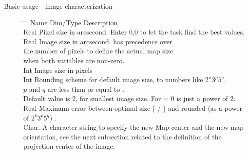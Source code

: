 \begin{description}
\item[Basic usage - image characterization] \mbox{}
\begin{tabbing}
\hspace{0.0cm} \= \hspace{3.4cm} \= \hspace{2.cm} \= \kill
\> Name \> Dim/Type \> Description \\
\>     \> [2] Real \> Pixel size in arcsecond. Enter 0,0 to let the task find the best values. \\
\>   \>[2] Real \> Image size in arcsecond.   has precedence over \\
                \> \> \> the number of pixels  to define the  actual map size \\
                \> \> \> when both variables are non-zero. \\
\>    \> [2] Int  \>   Image size in pixels \\
\>    \> Int \> Rounding scheme for default image size, to numbers like $2^{n}3^{p} 5^{q}$. \\
		  \> \> \> $p$ and $q$ are less than or equal to . \\
                \> \> \> Default value is 2, for smallest image size. For  = 0 
                 is just a power of 2. \\
\>  \> Real \> Maximum  error  between optimal size ( / ) 
        and rounded (as a power of $2^k 3^p 5^q$) . \\
\>   \> Char.  \>  A character string to specify the new Map center and the new map\\
                \> \>  \> orientation, see the next subsection related to the definition of the \\
                \> \> \> projection center of the image. \\
\end{tabbing}
\end{description}

